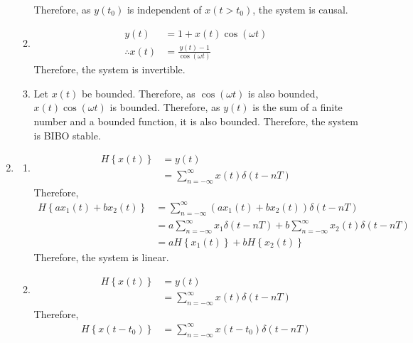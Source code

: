 \documentclass[fleqn, a4paper, 11pt, oneside]{amsart}
\theoremstyle{definition}
\theoremstyle{theorem}
\begin{document}
\begin{solution}
\begin{enumerate}[leftmargin=*]
\begin{enumerate}
					Therefore, as $y(t_0)$ is independent of $x(t > t_0)$, the system is causal.
				\item
					\begin{align*}
						y(t)            & = 1 + x(t) \cos(\omega t) \\
						\therefore x(t) & = \frac{y(t) - 1}{\cos(\omega t)}
					\end{align*}
					Therefore, the system is invertible.
				\item
					Let $x(t)$ be bounded.
					Therefore, as $\cos(\omega t)$ is also bounded, $x(t) \cos(\omega t)$ is bounded.
					Therefore, as $y(t)$ is the sum of a finite number and a bounded function, it is also bounded.
					Therefore, the system is BIBO stable.
			\end{enumerate}
		\item
			\begin{enumerate}
				\item
					\begin{align*}
						H\left\{ x(t) \right\} & = y(t) \\
                                                                       & = \sum\limits_{n = -\infty}^{\infty} x(t) \delta(t - n T)
					\end{align*}
					Therefore,
					\begin{align*}
						H\left\{ a x_1(t) + b x_2(t) \right\} & = \sum\limits_{n = -\infty}^{\infty} \left( a x_1(t) + b x_2(t) \right) \delta(t - n T)                                  \\
                                                                                      & = a \sum\limits_{n = -\infty}^{\infty} x_1 \delta(t - n T) + b \sum\limits_{n = -\infty}^{\infty} x_2(t) \delta(t - n T) \\
                                                                                      & = a H\left\{ x_1(t) \right\} + b H\left\{ x_2(t) \right\}
					\end{align*}
					Therefore, the system is linear.
				\item
					\begin{align*}
						H\left\{ x(t) \right\} & = y(t) \\
                                                                       & = \sum\limits_{n = -\infty}^{\infty} x(t) \delta(t - n T)
					\end{align*}
					Therefore,
					\begin{align*}
						H\left\{ x(t - t_0) \right\} & = \sum\limits_{n = -\infty}^{\infty} x(t - t_0) \delta(t - n T) \\

\end{align*}
\end{enumerate}
\end{enumerate}
\end{solution}
\end{document}
